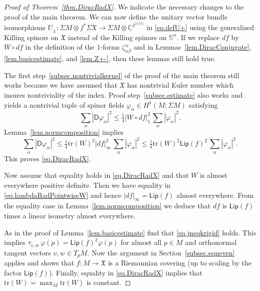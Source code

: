 \documentclass[11pt,reqno]{amsart}
\newcommand{\RadX}{\mathsf{Rad}_{\XX}}
\newcommand{\Lip}{\mathsf{Lip}}
\newcommand{\spindim}{2^{\lfloor n/2\rfloor}}
\newcommand{\Ctriv}{\underline{\mathbb{C}}^{\spindim}}
\newcommand{\Sn}{\mathbb{S}^n}
\newcommand{\XX}{\mathfrak{X}}
\newcommand{\tr}{\mathrm{tr}}
\newcommand{\D}{\mathsf{D}}
\renewcommand{\phi}{\varphi}
\newcommand{\<}{\langle}
\renewcommand{\>}{\rangle}
\theoremstyle{definition}
\begin{document}
\begin{proof}[Proof of Theorem~\ref{thm.DiracRadX}]
We indicate the necessary changes to the proof of the main theorem.
We can now define the unitary vector bundle isomorphisms $U_\pm\colon \Sigma M\otimes f^*\Sigma\XX \to \Sigma M\otimes \Ctriv$ in \eqref{eq.defU+} using the generalized Killing spinors on $\XX$ instead of the Killing spinors on $\Sn$.
If we replace $df$ by $W\circ df$ in the definition of the $1$-forms $\zeta_{\alpha\beta}^{\pm}$ and in Lemmas~\ref{lem.DiracConjugate}, \ref{lem.basicestimate}, and \ref{lem.Z+-}, then these lemmas still hold true.

The first step~\ref{subsec.nontrivialkernel} of the proof of the main theorem still works because we have assumed that $\XX$ has nontrivial Euler number which insures nontriviality of the index.
Proof step~\ref{subsec.estimate} also works and yields a nontrivial tuple of spinor fields $\phi_\alpha\in H^1(M;\Sigma M)$ satisfying
\begin{equation*}
\sum_\alpha |\D\phi_\alpha|^2
\le
\tfrac14 |W\circ df|_1^2 \,\sum_\alpha |\phi_\alpha|^2 .
\end{equation*}
Lemma~\ref{lem.normcomposition} implies 
\begin{equation}
\sum_\alpha |\D\phi_\alpha|^2
\le
\tfrac14 \tr(W)^2|df|_\infty^2 \,\sum_\alpha |\phi_\alpha|^2 
\le
\tfrac14 \tr(W)^2\Lip(f)^2 \,\sum_\alpha |\phi_\alpha|^2 .
\label{eq.lambdaRadPointwiseW}
\end{equation}
This proves \eqref{eq.DiracRadX}.


Now assume that equality holds in \eqref{eq.DiracRadX} and that $W$ is almost everywhere positive definite.
Then we have equality in \eqref{eq.lambdaRadPointwiseW} and hence $|df|_{\infty}=\Lip(f)$ almost everywhere. 
From the equality case in Lemma~\ref{lem.normcomposition} we deduce that $df$ is $\Lip(f)$ times a linear isometry almost everywhere.

As in the proof of Lemma~\ref{lem.basicestimate} find that \eqref{eq.jneqkrigid} holds.
This implies $\tau_{v,w}\,\phi(p) = \Lip(f)^2\phi(p)$ for almost all $p\in M$ and orthonormal tangent vectors $v,w\in T_pM$.
Now the argument in Section~\ref{subsec.eqneven} applies and shows that $f\colon M\to \XX$ is a Riemannian covering (up to scaling by the factor $\Lip(f)$).
Finally, equality in \eqref{eq.DiracRadX} implies that $\tr(W)=\max_M\tr(W)$ is constant. 
\end{proof}
\end{document}
